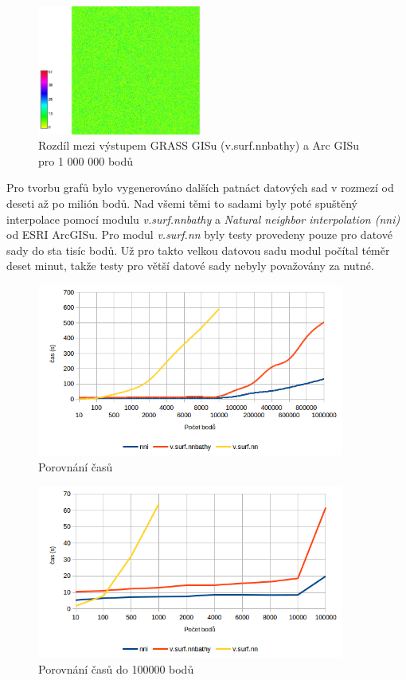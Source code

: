 \documentclass[12pt,a4paper]{article}
\begin{document}
\begin{figure}[h!]
\centering
\includegraphics[width=0.48\textwidth]{img/diff_mil.png}
\caption{Rozdíl mezi výstupem GRASS GISu (v.surf.nnbathy) a Arc GISu pro 1 000 000 bodů}
\label{fig:dif_mil}
\end{figure}

\newpage
Pro tvorbu grafů bylo vygenerováno dalších patnáct datových sad v rozmezí od deseti až po milión bodů. Nad všemi těmi to sadami byly poté spuštěný interpolace pomocí modulu \emph{v.surf.nnbathy} a \emph{Natural neighbor interpolation (nni)} od ESRI Arc\-GISu. Pro modul \emph{v.surf.nn} byly testy provedeny pouze pro datové sady do sta tisíc bodů. Už pro takto velkou datovou sadu modul počítal téměr deset minut, takže testy pro větší datové sady nebyly považovány za nutné.

\begin{figure}[h!]
\centering
\includegraphics[width=0.9\textwidth]{img/graf.png}
\caption{Porovnání časů}
\label{fig:graf}
\end{figure}

\begin{figure}[h!]
\centering
\includegraphics[width=0.9\textwidth]{img/graf_detail.png}
\caption{Porovnání časů do 100000 bodů}
\label{fig:graf_det}
\end{figure}
\end{document}

